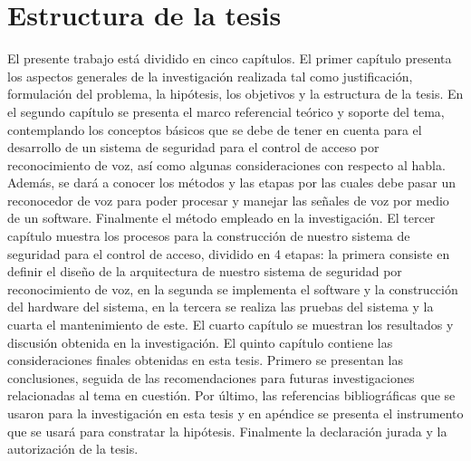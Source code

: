 \section{Estructura de la tesis}
El presente trabajo está dividido en cinco capítulos. El primer capítulo presenta los aspectos generales de la investigación realizada tal como justificación, formulación del problema, la hipótesis, los objetivos y la estructura de la tesis.
\vskip 0.5cm
En el segundo capítulo se presenta el marco referencial teórico y soporte del tema, contemplando los conceptos básicos que se debe de tener en cuenta para el desarrollo de un sistema de seguridad para el control de acceso por reconocimiento de voz, así como algunas consideraciones con respecto al habla. Además, se dará a conocer los métodos y las etapas por las cuales debe pasar un reconocedor de voz para poder procesar y manejar las señales de voz por medio de un software. Finalmente el método empleado en la investigación.
\vskip 0.5cm
El tercer capítulo muestra los procesos para la construcción de nuestro sistema de seguridad para el control de acceso, dividido en 4 etapas: la primera consiste en definir el diseño de la arquitectura de nuestro sistema de seguridad por reconocimiento de voz, en la segunda se implementa el software y la construcción del hardware del sistema, en la tercera se realiza las pruebas del sistema y la cuarta el mantenimiento de este.
\vskip 0.5cm
El cuarto capítulo se muestran los resultados y discusión obtenida en la investigación. El quinto capítulo contiene las consideraciones finales obtenidas en esta tesis. Primero se presentan las conclusiones, seguida de las recomendaciones para futuras investigaciones relacionadas al tema en cuestión. 
\vskip 0.5cm
Por último, las referencias bibliográficas que se usaron para la investigación en esta tesis y en apéndice se presenta el instrumento que se usará para constratar la hipótesis. Finalmente la declaración jurada y la autorización de la tesis.